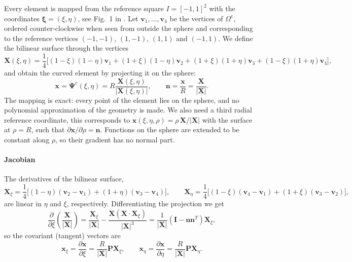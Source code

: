 Every element is mapped from the reference square $I = [-1,1]^2$ with the coordinates $\boldsymbol{\xi} = (\xi,\eta)$, see Fig.~1 in \cite{GIRALDO2002499}. Let $\mathbf{v}_1,\dots,\mathbf{v}_4$ be the vertices of $\Omega^e$, ordered counter-clockwise when seen from outside the sphere and corresponding to the reference vertices $(-1,-1)$, $(1,-1)$, $(1,1)$ and $(-1,1)$. We define the bilinear surface through the vertices
\begin{equation}
    \mathbf{X}(\xi,\eta) = \frac14\Big[(1-\xi)(1-\eta)\mathbf{v}_1 + (1+\xi)(1-\eta)\mathbf{v}_2 + (1+\xi)(1+\eta)\mathbf{v}_3 + (1-\xi)(1+\eta)\mathbf{v}_4\Big],
\end{equation}
and obtain the curved element by projecting it on the sphere:
\begin{equation}\label{eq:dg-mapping}
    \mathbf{x} = \boldsymbol{\Psi}^e(\xi,\eta) = R\frac{\mathbf{X}(\xi,\eta)}{|\mathbf{X}(\xi,\eta)|}, \qquad \mathbf{n} = \frac{\mathbf{x}}{R} = \frac{\mathbf{X}}{|\mathbf{X}|}.
\end{equation}
The mapping is exact: every point of the element lies on the sphere, and no polynomial approximation of the geometry is made. We also need a third radial reference coordinate, this corresponds to $\mathbf{x}(\xi,\eta,\rho) = \rho\,\mathbf{X}/|\mathbf{X}|$ with the surface at $\rho = R$, such that $\partial\mathbf{x}/\partial\rho = \mathbf{n}$. Functions on the sphere are extended to be constant along $\rho$, so their gradient has no normal part.

\paragraph{Jacobian}
The derivatives of the bilinear surface,
\begin{equation*}
    \mathbf{X}_\xi = \frac14\Big[(1-\eta)(\mathbf{v}_2 - \mathbf{v}_1) + (1+\eta)(\mathbf{v}_3 - \mathbf{v}_4)\Big], \qquad
    \mathbf{X}_\eta = \frac14\Big[(1-\xi)(\mathbf{v}_4 - \mathbf{v}_1) + (1+\xi)(\mathbf{v}_3 - \mathbf{v}_2)\Big],
\end{equation*}
are linear in $\eta$ and $\xi$, respectively. Differentiating the projection we get
\begin{equation*}
    \frac{\partial}{\partial\xi}\left(\frac{\mathbf{X}}{|\mathbf{X}|}\right)
    = \frac{\mathbf{X}_\xi}{|\mathbf{X}|} - \frac{\mathbf{X}(\mathbf{X}\cdot\mathbf{X}_\xi)}{|\mathbf{X}|^3}
    = \frac{1}{|\mathbf{X}|}\left(\mathbf{I} - \mathbf{n}\mathbf{n}^T\right)\mathbf{X}_\xi,
\end{equation*}
so the covariant (tangent) vectors are
\begin{equation}\label{eq:dg-covariant}
    \mathbf{x}_\xi = \frac{\partial\mathbf{x}}{\partial\xi} = \frac{R}{|\mathbf{X}|}\mathbf{P}\mathbf{X}_\xi, \qquad
    \mathbf{x}_\eta = \frac{\partial\mathbf{x}}{\partial\eta} = \frac{R}{|\mathbf{X}|}\mathbf{P}\mathbf{X}_\eta .
\end{equation}

